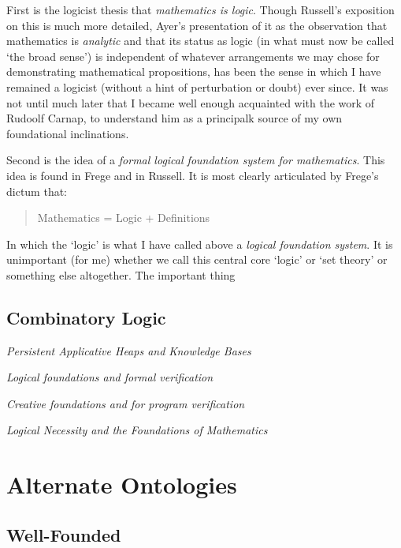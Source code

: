 \documentclass[10pt,titlepage]{book}
\begin{document}
First is the logicist thesis that \emph{mathematics is logic}.
Though Russell's exposition on this is much more detailed, Ayer's presentation of it as the observation that mathematics is \emph{analytic} and that its status as logic (in what must now be called `the broad sense') is independent of whatever arrangements we may chose for demonstrating mathematical propositions, has been the sense in which I have remained a logicist (without a hint of perturbation or doubt) ever since.
It was not until much later that I became well enough acquainted with the work of Rudoolf Carnap, to understand him as a principalk source of my own foundational inclinations. 

Second is the idea of a \emph{formal logical foundation system for mathematics}.
This idea is found in Frege and in Russell.
It is most clearly articulated by Frege's dictum that:

\begin{centering}
\begin{quote}
Mathematics = Logic + Definitions
\end{quote}
\end{centering}

In which the `logic' is what I have called above a \emph{logical foundation system}.
It is unimportant (for me) whether we call this central core `logic' or `set theory' or something else altogether.
The important thing 

\subsection{Combinatory Logic}

\emph{Persistent Applicative Heaps and Knowledge Bases}\cite{jones85}

\emph{Logical foundations and formal verification}\cite{jones86a}

\emph{Creative foundations and for program verification}\cite{jones86b}

\emph{Logical Necessity and the Foundations of Mathematics}\cite{jones87}

\section{Alternate Ontologies}

\subsection{Well-Founded}
\end{document}
